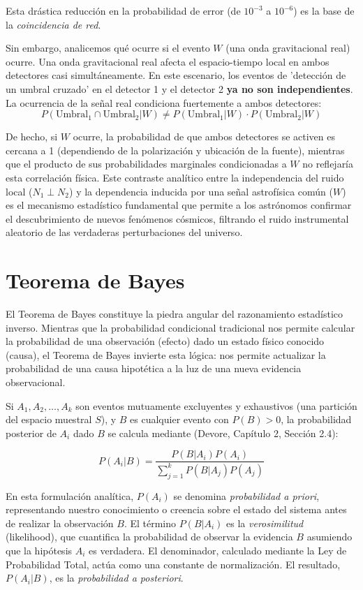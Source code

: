 Esta drástica reducción en la probabilidad de error (de $10^{-3}$ a $10^{-6}$) es la base de la \textit{coincidencia de red}. 

Sin embargo, analicemos qué ocurre si el evento $W$ (una onda gravitacional real) ocurre. Una onda gravitacional real afecta el espacio-tiempo local en ambos detectores casi simultáneamente. En este escenario, los eventos de 'detección de un umbral cruzado' en el detector 1 y el detector 2 \textbf{ya no son independientes}. La ocurrencia de la señal real condiciona fuertemente a ambos detectores:
$$ P(\text{Umbral}_1 \cap \text{Umbral}_2 | W) \neq P(\text{Umbral}_1 | W) \cdot P(\text{Umbral}_2 | W) $$

De hecho, si $W$ ocurre, la probabilidad de que ambos detectores se activen es cercana a 1 (dependiendo de la polarización y ubicación de la fuente), mientras que el producto de sus probabilidades marginales condicionadas a $W$ no reflejaría esta correlación física. Este contraste analítico entre la independencia del ruido local ($N_1 \perp N_2$) y la dependencia inducida por una señal astrofísica común ($W$) es el mecanismo estadístico fundamental que permite a los astrónomos confirmar el descubrimiento de nuevos fenómenos cósmicos, filtrando el ruido instrumental aleatorio de las verdaderas perturbaciones del universo.

\section{Teorema de Bayes}

El Teorema de Bayes constituye la piedra angular del razonamiento estadístico inverso. Mientras que la probabilidad condicional tradicional nos permite calcular la probabilidad de una observación (efecto) dado un estado físico conocido (causa), el Teorema de Bayes invierte esta lógica: nos permite actualizar la probabilidad de una causa hipotética a la luz de una nueva evidencia observacional. 

Si $A_1, A_2, \dots, A_k$ son eventos mutuamente excluyentes y exhaustivos (una partición del espacio muestral $S$), y $B$ es cualquier evento con $P(B) > 0$, la probabilidad posterior de $A_i$ dado $B$ se calcula mediante (Devore, Capítulo 2, Sección 2.4):

$$ P(A_i | B) = \frac{P(B | A_i) P(A_i)}{\sum_{j=1}^k P(B | A_j) P(A_j)} $$

En esta formulación analítica, $P(A_i)$ se denomina \textit{probabilidad a priori}, representando nuestro conocimiento o creencia sobre el estado del sistema antes de realizar la observación $B$. El término $P(B | A_i)$ es la \textit{verosimilitud} (likelihood), que cuantifica la probabilidad de observar la evidencia $B$ asumiendo que la hipótesis $A_i$ es verdadera. El denominador, calculado mediante la Ley de Probabilidad Total, actúa como una constante de normalización. El resultado, $P(A_i | B)$, es la \textit{probabilidad a posteriori}. 

